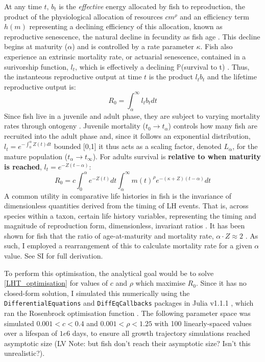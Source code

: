 \documentclass[a4paper]{article} %
\begin{document}
At any time $t$, $b_{t}$ is the \textit{effective} energy allocated by fish to reproduction, the product of the physiological allocation of resources $cm^{\rho}$ and an efficiency term $h(m)$ representing a declining efficiency of this allocation, known as reproductive senescence, the natural decline in fecundity as fish age \autocite{Stearns2000, Benoit2018, Vrtilek2018}. This decline begins at maturity ($\alpha$) and is controlled by a rate parameter $\kappa$. Fish also experience an extrinsic mortality rate, or actuarial senescence, contained in a surivorship function, $l_t$, which is effectively a declining $\mathbb{P}$(survival to t) \autocite{Peterson1984, Charnov1993, Charnov2001, Benoit2018, Laird2010, Reznick2002, Reznick2006}. Thus, the instanteous reproductive output at time $t$ is the product $l_{t}b_{t}$ and the lifetime reproductive output is:
\begin{equation}
    R_{0} = \int_{\alpha}^{\infty}l_{t}b_{t} dt
\end{equation}
Since fish live in a juvenile and adult phase, they are subject to varying mortality rates through ontogeny \autocite{Charnov2001}. Juvenile mortality ($t_0 \rightarrow t_{\alpha}$) controls how many fish are recruited into the adult phase and, since it follows an exponential distribution, $l_t = e^{-\int_{0}^{\alpha}Z(t)dt}$ bounded [0,1] it thus acts as a scaling factor, denoted $L_{\alpha}$, for the mature population ($t_{\alpha} \rightarrow t_{\infty}$). For adults survival is \textbf{relative to when maturity is reached}, $l_{t} = e^{-Z(t-\alpha)}$:
\begin{equation}
    R_{0} = c\int_{0}^{\alpha}e^{-Z(t)}dt\int_{\alpha}^{\infty} m(t)^{\rho} e^{-(\kappa+Z)(t-\alpha)} dt \label{LHT_optimisation}
\end{equation}
A common utility in comparative life histories in fish is the invariance of dimensionless quantities derived from the timing of LH events. That is, across species within a taxon, certain life history variables, representing the timing and magnitude of reproduction form, dimensionless, invariant ratios \autocite{Charnov1993}. It has been shown for fish that the ratio of age-at-maturity and mortality rate, $\alpha\cdot Z \approx 2$ \autocite{Charnov1993}. As such, I employed a rearrangement of this to calculate mortality rate for a given $\alpha$ value.
See SI for full derivation.

To perform this optimisation, the analytical goal would be to solve \cref{LHT_optimisation} for values of $c$ and $\rho$ which maximise $R_0$. Since it has no closed-form solution, I simulated this numerically using the \texttt{DifferentialEquations} and \texttt{DiffEqCallbacks} packages in Julia v1.1.1 \autocite{Bezanson2017}, which ran the Rosenbrock optimisation function \autocite{Rosenbrock1960}. The following parameter space was simulated $0.001 < c < 0.4$ and $0.001 < \rho < 1.25$ with 100 linearly-spaced values over a lifespan of $1e6$ days, to ensure all growth trajectory simulations reached asymptotic size (LV Note: but fish don't reach their asymptotic size? Isn't this unrealistic?).
\end{document}
